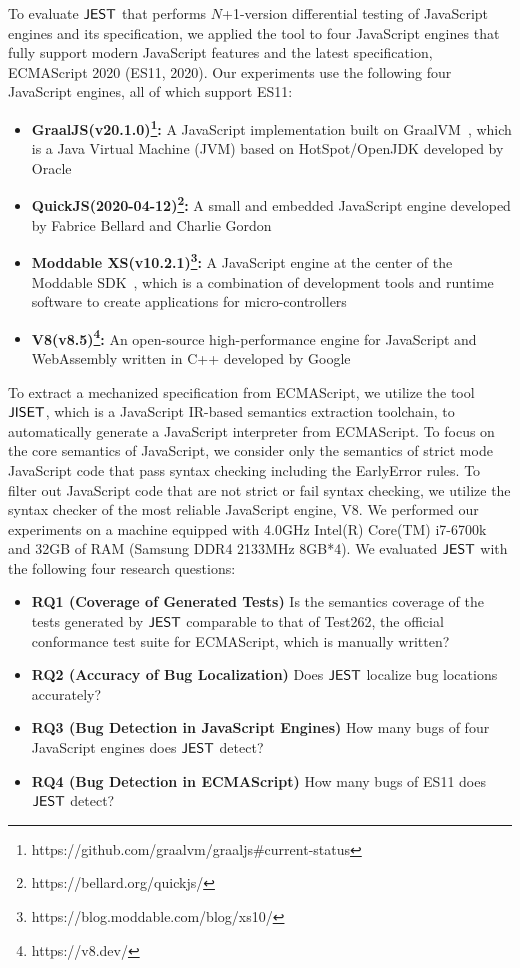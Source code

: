 To evaluate $\tool$ that performs $N$+1-version differential testing of JavaScript
engines and its specification, we applied the tool to four JavaScript engines that
fully support modern JavaScript features and the latest specification,
ECMAScript 2020 (ES11, 2020).  Our experiments use the following four JavaScript
engines, all of which support ES11:
\begin{itemize}
  \item \textbf{GraalJS(v20.1.0)\footnote{https://github.com/graalvm/graaljs\#current-status}:} A JavaScript implementation built on
    GraalVM~\cite{graaljs}, which is a Java Virtual Machine (JVM) based on
    HotSpot/OpenJDK developed by Oracle
  \item \textbf{QuickJS(2020-04-12)\footnote{https://bellard.org/quickjs/}:} A small and embedded JavaScript engine developed by
    Fabrice Bellard and Charlie Gordon~\cite{qjs}
  \item \textbf{Moddable XS(v10.2.1)\footnote{https://blog.moddable.com/blog/xs10/}:} A JavaScript engine at the center of the Moddable
    SDK~\cite{xs}, which is a combination of development tools and runtime
    software to create applications for micro-controllers
  \item \textbf{V8(v8.5)\footnote{https://v8.dev/}:} An open-source high-performance engine
for JavaScript and WebAssembly written in C++ developed by Google~\cite{v8}
\end{itemize}
To extract a mechanized specification from ECMAScript, we utilize the tool
$\jiset$, which is a JavaScript IR-based semantics extraction
toolchain, to automatically generate a JavaScript interpreter from ECMAScript.
To focus on the core semantics of JavaScript, we consider only the semantics of strict mode
JavaScript code that pass syntax checking including the EarlyError rules.  To
filter out JavaScript code that are not strict or fail syntax checking,
we utilize the syntax checker of the most reliable JavaScript engine, V8.
We performed our experiments on a machine equipped with 4.0GHz Intel(R) Core(TM)
i7-6700k and 32GB of RAM (Samsung DDR4 2133MHz 8GB*4).  We evaluated $\tool$
with the following four research questions:
\begin{itemize}
\item {\bf RQ1 (Coverage of Generated Tests)} Is the semantics
coverage of the tests generated by $\tool$ comparable to that of Test262,
the official conformance test suite for ECMAScript, which is manually written?
\item {\bf RQ2 (Accuracy of Bug Localization)} Does $\tool$ localize bug locations
accurately?
\item {\bf RQ3 (Bug Detection in JavaScript Engines)} How many
bugs of four JavaScript engines does $\tool$ detect?
\item {\bf RQ4 (Bug Detection in ECMAScript)} How many
bugs of ES11 does $\tool$ detect?
\end{itemize}


